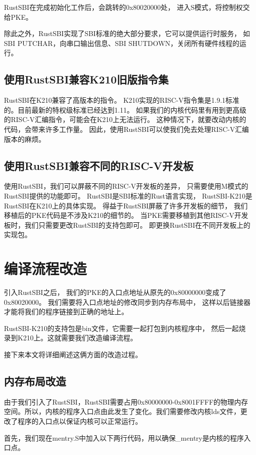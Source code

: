 RustSBI在完成初始化工作后，会跳转的0x80020000处，
进入S模式，将控制权交给PKE。

除此之外，RustSBI实现了SBI标准的绝大部分要求，它可以提供运行时服务，
如SBI PUTCHAR，向串口输出信息、SBI SHUTDOWN，关闭所有硬件线程的运行。

\subsection{使用RustSBI兼容K210旧版指令集}

RustSBI在K210兼容了高版本的指令。
K210实现的RISC-V指令集是1.9.1标准的。目前最新的特权级标准已经达到1.11。
如果我们的内核代码里有用到更高级的RISC-V汇编指令，可能会在K210上无法运行。
这种情况下，就要改动内核的代码，会带来许多工作量。
因此，使用RustSBI可以使我们免去处理RISC-V汇编版本的麻烦。

\subsection{使用RustSBI兼容不同的RISC-V开发板}

使用RustSBI，我们可以屏蔽不同的RISC-V开发板的差异，
只需要使用M模式的RustSBI提供的功能即可。
RustSBI是SBI标准的Rust语言实现，
RustSBI-K210是RustSBI在K210上的具体实现。
得益于RustSBI屏蔽了许多开发板的细节，
我们移植后的PKE代码是不涉及K210的细节的。
当PKE需要移植到其他RISC-V开发板时，我们只需要更改RustSBI的支持包即可。
即更换RustSBI在不同开发板上的实现包。


\section{编译流程改造}

引入RustSBI之后，
我们的PKE的入口点地址从原先的0x80000000变成了0x80020000。
我们需要将入口点地址的修改同步到内存布局中，
这样以后链接器才能将我们的程序链接到正确的地址上。

RustSBI-K210的支持包是bin文件，它需要一起打包到内核程序中，
然后一起烧录到K210上。这就需要我们改造编译流程。

接下来本文将详细阐述这俩方面的改造过程。

\subsection{内存布局改造}
由于我们引入了RustSBI，RustSBI需要占用0x80000000-0x8001FFFF的物理内存空间。所以，内核的程序入口点由此发生了变化。我们需要修改内核lds文件，更改了程序的入口点以保证内核可以正常运行。

首先，我们现在mentry.S中加入以下两行代码，用以确保\_mentry是内核的程序入口点。

